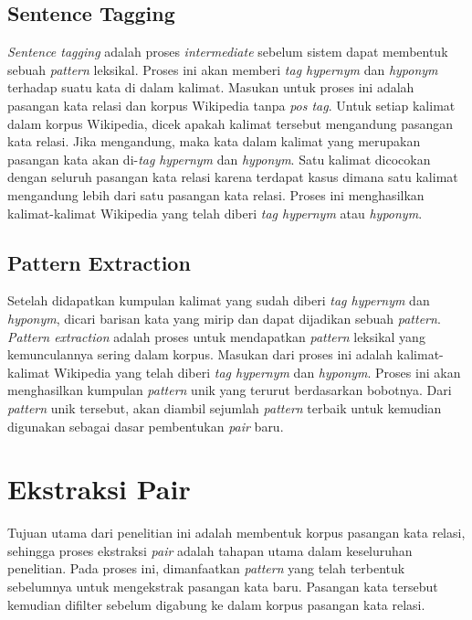 \subsection{Sentence Tagging}
\textit{Sentence tagging} adalah proses \textit{intermediate} sebelum sistem dapat membentuk sebuah \textit{pattern} leksikal. Proses ini akan memberi \textit{tag hypernym} dan \textit{hyponym} terhadap suatu kata di dalam kalimat. Masukan untuk proses ini adalah pasangan kata relasi dan korpus Wikipedia tanpa \textit{pos tag}. Untuk setiap kalimat dalam korpus Wikipedia, dicek apakah kalimat tersebut mengandung pasangan kata relasi. Jika mengandung, maka kata dalam kalimat yang merupakan pasangan kata akan di-\textit{tag} \textit{hypernym} dan \textit{hyponym}. Satu kalimat dicocokan dengan seluruh pasangan kata relasi karena terdapat kasus dimana satu kalimat mengandung lebih dari satu pasangan kata relasi. Proses ini menghasilkan kalimat-kalimat Wikipedia yang telah diberi \textit{tag hypernym} atau \textit{hyponym}.

\subsection{Pattern Extraction}
Setelah didapatkan kumpulan kalimat yang sudah diberi \textit{tag hypernym} dan \textit{hyponym}, dicari barisan kata yang mirip dan dapat dijadikan sebuah \textit{pattern}. \textit{Pattern extraction} adalah proses untuk mendapatkan \textit{pattern} leksikal yang kemunculannya sering dalam korpus. Masukan dari proses ini adalah kalimat-kalimat Wikipedia yang telah diberi \textit{tag hypernym} dan \textit{hyponym}. Proses ini akan menghasilkan kumpulan \textit{pattern} unik yang terurut berdasarkan bobotnya. Dari \textit{pattern} unik tersebut, akan diambil sejumlah \textit{pattern} terbaik untuk kemudian digunakan sebagai dasar pembentukan \textit{pair} baru.


\section{Ekstraksi Pair}
Tujuan utama dari penelitian ini adalah membentuk korpus pasangan kata relasi, sehingga proses ekstraksi \textit{pair} adalah tahapan utama dalam keseluruhan penelitian. Pada proses ini, dimanfaatkan \textit{pattern} yang telah terbentuk sebelumnya untuk mengekstrak pasangan kata baru. Pasangan kata tersebut kemudian difilter sebelum digabung ke dalam korpus pasangan kata relasi.

